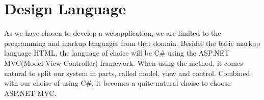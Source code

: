 \section{Design Language}
\label{sec:design_language}

As we have chosen to develop a webapplication, we are limited to the programming and markup languages from that domain.
Besides the basic markup language HTML, the language of choice will be C\# using the ASP.NET MVC(Model-View-Controller) framework. When using the \ooad method, it comes natural to split our system in parts, called model, view and control. Combined with our choise of using C\#, it becomes a quite natural choise to choose ASP.NET MVC.


